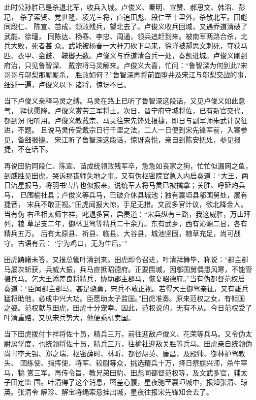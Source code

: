 此时公孙胜已是杀退北军，收兵入城。卢俊义、秦明、宣赞、郝思文、韩滔、彭玘，
杀了索贤、党世隆、凌光三将，直追田彪、段仁至十里外，杀散北军。田彪同段仁、
陈宣、苗成，领败残兵，望北去了。卢俊义收兵回城，又遇乔道清破了武能、徐瑾，
同陈达、杨春、李忠、周通，领兵追赶到来。被南军两路合杀，北兵大败，死者甚
众。武能被杨春一大杆刀砍下马来，徐瑾被郝思文刺死，夺获马匹、衣甲、金鼓、
鞍辔无数。卢俊义与乔道清合兵一处，奏凯进城。卢俊义刚到府治，只见鲁智深、
戴宗将马灵解来。卢俊义大喜，忙问：“鲁智深为何到此?宋哥哥与邬梨那厮厮杀，
胜败如何？”鲁智深再将前面堕井及宋江与邬梨交战的事，细述一遍，卢俊义以下
诸将，惊讶不已。

当下卢俊义亲释马灵之缚。马灵在路上已听了鲁智深这段话，又见卢俊义如此意气，
拜伏愿降。卢俊义赏劳三军将士。次日，晋宁府守城将佐，已有新官交代，都到汾
阳听用。卢俊义教戴宗、马灵往宋先锋处报捷，即日与副军师朱武计议征进，不题。
且说马灵传受戴宗日行千里之法，二人一日便到宋先锋军前，入寨参见，备细报捷。
宋江听了鲁智深这段话，惊讶喜悦，亲自到陈安抚处，参见报捷，不在话下。

再说田豹同段仁、陈宣、苗成统领败残军卒，急急如丧家之狗，忙忙似漏网之鱼，
到威胜见田虎，哭诉那丧师失地之事。又有伪枢密院官急入内启奏道：“大王，两
日流星报马，将羽书雪片也似报来，说统军大将马灵已被擒拿；关胜、呼延灼兵马，
已围榆社县；卢俊义等兵马，已破介休县城池；独有襄垣县邬国舅处，屡有捷音，
宋兵不敢正视。”田虎闻报大惊，手足无措。文武多官计议，欲北降金人。当有伪
右丞相太师卞祥，叱退多官，启奏道：“宋兵纵有三路，我这威胜，万山环列，粮
草足支二年，御林卫驾等精兵二十余万。东有武乡，西有沁源二县，各有精兵五万。
后有太原县、祈县、临县、大谷县，城池坚固，粮草充足，尚可战守。古语有云：
‘宁为鸡口，无为牛后。’”

田虎踌躇未答，又报总管叶清到来。田虎即令召进，叶清拜舞毕，称说：“郡主郡
马屡次斩获，兵威大振，兵马直抵昭德府。正要围城，因邬国舅偶患风寒，不能管
摄兵马。乞大王添差良将精兵，协助郡主郡马，恢复昭德府。”当有伪都督范权启
奏道：“臣闻郡主郡马，甚是骁勇，宋兵不敢正视。若得大王御驾亲征，又有雄兵
猛将助他，必成中兴大功。臣愿助太子监国。”田虎准奏。原来范权之女，有倾国
之姿。范权献与田虎，田虎十分宠幸。因此，范权说的，无有不从。今日范权受了
叶清重赂，又见宋兵势大，他便乘机卖国。

当下田虎拨付卞祥将佐十员，精兵三万，前往迎敌卢俊义、花荣等兵马。又令伪太
尉房学度，也统领将佐十员，精兵三万，往榆社迎敌关胜等兵马。田虎亲自统领伪
尚书李天锡、郑之瑞、枢密薛时、林昕、都督胡英、唐昌，及殿帅、御林护驾教头、
团练使、指挥使、将军、较尉等众，挑选精兵十万，择日祭旗兴师，杀牛宰马，犒
赏三军。再传令旨，教兄弟田豹、田彪同都督范权等，及文武多官，辅太子田定监
国。叶清得了这个消息，密差心腹，星夜驰至襄垣城中，报知张清、琼英。张清令
解珍、解宝将绳索悬挂出城，星夜往报宋先锋知会去了。

